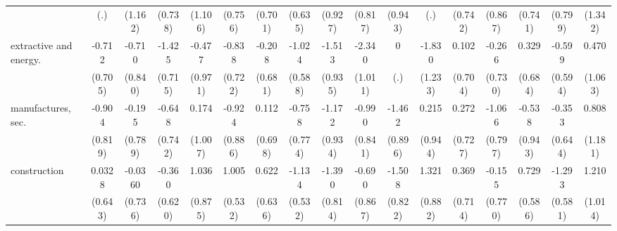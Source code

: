 {\begin{tabular}{l*{16}{c}}
                    &         (.)         &     (1.162)         &     (0.738)         &     (1.106)         &     (0.756)         &     (0.701)         &     (0.635)         &     (0.927)         &     (0.817)         &     (0.943)         &         (.)         &     (0.742)         &     (0.867)         &     (0.741)         &     (0.799)         &     (1.342)         \\
[1em]
extractive and energy.&      -0.712         &      -0.710         &      -1.425\sym{*}  &      -0.477         &      -0.838         &      -0.208         &      -1.024         &      -1.513         &      -2.340\sym{*}  &           0         &      -1.830         &       0.102         &      -0.266         &       0.329         &      -0.599         &       0.470         \\
                    &     (0.705)         &     (0.840)         &     (0.715)         &     (0.971)         &     (0.722)         &     (0.681)         &     (0.588)         &     (0.935)         &     (1.011)         &         (.)         &     (1.233)         &     (0.704)         &     (0.730)         &     (0.684)         &     (0.594)         &     (1.063)         \\
[1em]
manufactures, sec.  &      -0.904         &      -0.195         &      -0.648         &       0.174         &      -0.924         &       0.112         &      -0.758         &      -1.172         &      -0.990         &      -1.462         &       0.215         &       0.272         &      -1.066         &      -0.538         &      -0.353         &       0.808         \\
                    &     (0.819)         &     (0.789)         &     (0.742)         &     (1.007)         &     (0.886)         &     (0.698)         &     (0.774)         &     (0.934)         &     (0.841)         &     (0.896)         &     (0.944)         &     (0.727)         &     (0.797)         &     (0.943)         &     (0.644)         &     (1.181)         \\
[1em]
construction        &      0.0328         &     -0.0360         &      -0.360         &       1.036         &       1.005         &       0.622         &      -1.134\sym{*}  &      -1.390         &      -0.690         &      -1.508         &       1.321         &       0.369         &      -0.155         &       0.729         &      -1.293\sym{*}  &       1.210         \\
                    &     (0.643)         &     (0.736)         &     (0.620)         &     (0.875)         &     (0.532)         &     (0.636)         &     (0.532)         &     (0.814)         &     (0.867)         &     (0.822)         &     (0.882)         &     (0.714)         &     (0.770)         &     (0.586)         &     (0.581)         &     (1.014)         \\

\end{tabular}}
